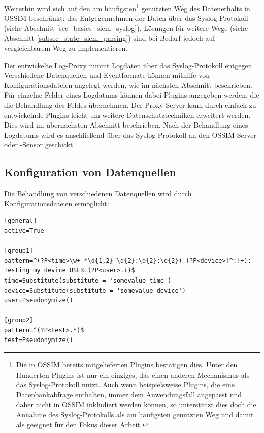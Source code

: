 Weiterhin wird sich auf den am häufigsten\footnote{
  Die in OSSIM bereits mitgelieferten Plugins bestätigen dies. Unter den Hunderten Plugins ist nur ein einziges, das einen anderen Mechanismus als das Syslog-Protokoll nutzt. Auch wenn beispielsweise Plugins, die eine Datenbankabfrage enthalten, immer dem Anwendungsfall angepasst und daher nicht in OSSIM inkludiert werden können, so unterstützt dies doch die Annahme des Syslog-Protokolls als am häufigsten genutzten Weg und damit als geeignet für den Fokus dieser Arbeit. 
} genutzten Weg des Datenerhalts in OSSIM beschränkt: das Entgegennehmen der Daten über das Syslog-Protokoll (siehe Abschnitt \ref{sec_basics_siem_syslog}). Lösungen für weitere Wege (siehe Abschnitt \ref{subsec_state_siem_parsing}) sind bei Bedarf jedoch auf vergleichbarem Weg zu implementieren.

Der entwickelte Log-Proxy nimmt Logdaten über das Syslog-Protokoll entgegen. Verschiedene Datenquellen und Eventformate können mithilfe von Konfigurationsdateien angelegt werden, wie im nächsten Abschnitt beschrieben. Für einzelne Felder eines Logdatums können dabei Plugins angegeben werden, die die Behandlung des Feldes übernehmen. Der Proxy-Server kann durch einfach zu entwickelnde Plugins leicht um weitere Datenschutztechniken erweitert werden. Dies wird im übernächsten Abschnitt beschrieben. Nach der Behandlung eines Logdatums wird es anschließend über das Syslog-Protokoll an den OSSIM-Server oder -Sensor geschickt.

\subsection{Konfiguration von Datenquellen}
\label{sec_integration_in_ossim_datasource_config}

Die Behandlung von verschiedenen Datenquellen wird durch Konfigurationsdateien ermöglicht:

\begin{lstlisting}[morekeywords={general,active,pattern,group1,group2}]
[general]
active=True

[group1]
pattern=^(?P<time>\w+ *\d{1,2} \d{2}:\d{2}:\d{2}) (?P<device>[^:]+): Testing my device USER=(?P<user>.+)$
time=Substitute(substitute = 'somevalue_time')
device=Substitute(substitute = 'somevalue_device')
user=Pseudonymize()

[group2]
pattern=^(?P<test>.*)$
test=Pseudonymize()
\end{lstlisting}

